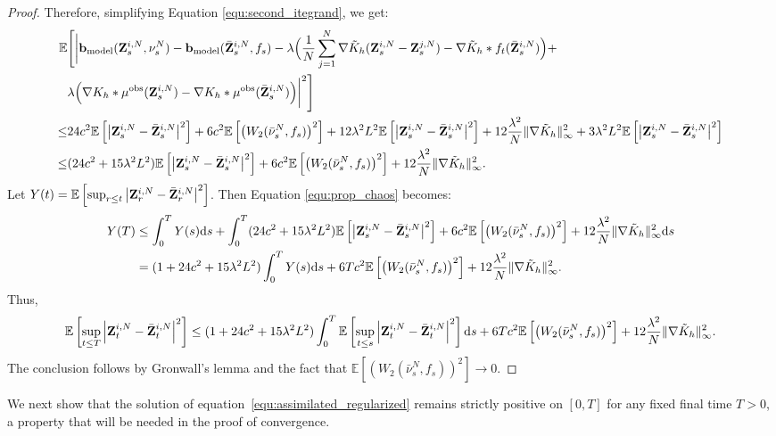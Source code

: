 \begin{proof}
Therefore, simplifying Equation \eqref{equ:second_itegrand}, we get:
\begin{equation*}
\begin{aligned}
\mathbb E &\Bigg[\bigg|\mathbf{b}_\mathrm{model}(\mathbf{Z}^{i,N}_s,\nu_s^N) - \mathbf{b}_\mathrm{model}(\bar{\mathbf{Z}}^{i,N}_s, f_s) - \lambda \Big(\frac{1}{N}\sum_{j=1}^N \nabla \tilde  K_h(\mathbf{Z}^{i,N}_s - \mathbf{Z}^{j,N}_s) - \nabla \tilde{K}_h*f_t(\bar{\mathbf{Z}}^{i,N}_s)  \Big) +\\&\lambda\Big(\nabla   K_h *\mu^{\mathrm{obs}} (\mathbf{Z}^{i,N}_s) - \nabla   K_h *\mu^{\mathrm{obs}} (\bar{\mathbf{Z}}^{i,N}_s)\Big)\bigg|^2\Bigg] \\
\leq & 24c^2 \mathbb E\left[\left|\mathbf{Z}^{i,N}_s-\bar{\mathbf{Z}}^{i,N}_s\right|^2\right] + 6c^2 \mathbb E \left[\left(W_2(\bar{\nu}^N_s,f_s)\right)^2\right] + 12\lambda^2 L^2 \mathbb E \left[\left|\mathbf{Z}^{i,N}_s - \bar{\mathbf{Z}}^{i,N}_s\right|^2\right] + 12\frac{\lambda^2}{N} \|\nabla\tilde{K}_h\|_\infty^2 +
3 \lambda^2 L^2 \mathbb E \left[ \left|\mathbf{Z}^{i,N}_s - \bar{\mathbf{Z}}^{i,N}_s\right|^2\right]\\
\leq & (24c^2+ 15\lambda^2 L^2) \mathbb E \left[ \left|\mathbf{Z}^{i,N}_s - \bar{\mathbf{Z}}^{i,N}_s\right|^2\right] + 6c^2\mathbb E \left[\left(W_2(\bar{\nu}^N_s,f_s)\right)^2\right] + 12\frac{\lambda^2}{N} \|\nabla\tilde{K}_h\|_\infty^2.
\end{aligned}
\end{equation*}
Let $Y(t) = \mathbb E\left[\sup_{r\leq t}\left|\mathbf{Z}^{i,N}_r-\bar{\mathbf{Z}}^{i,N}_r\right|^2\right]$. Then Equation \eqref{equ:prop_chaos} becomes:
\begin{equation*}
\begin{aligned}
Y(T) &\leq \int^T_0 Y(s) \mathrm{d} s + \int^T_0 (24c^2+ 15\lambda^2 L^2) \mathbb E \left[ \left|\mathbf{Z}^{i,N}_s - \bar{\mathbf{Z}}^{i,N}_s\right|^2\right] + 6c^2\mathbb E \left[\left(W_2(\bar{\nu}^N_s,f_s)\right)^2\right]+ 12\frac{\lambda^2}{N} \|\nabla\tilde{K}_h\|_\infty^2\mathrm{d} s\\
&= (1+24c^2+ 15\lambda^2 L^2) \int^T_0 Y(s) \mathrm{d} s + 6Tc^2\mathbb E \left[\left(W_2(\bar{\nu}^N_s,f_s)\right)^2\right] + 12\frac{\lambda^2}{N} \|\nabla\tilde{K}_h\|_\infty^2.
\end{aligned}
\end{equation*}
Thus,
\[
\begin{aligned}
    \mathbb E\left[\sup_{t\leq T}\left|\mathbf{Z}^{i,N}_t-\bar{\mathbf{Z}}^{i,N}_t\right|^2\right] \leq (1+24c^2+ 15\lambda^2 L^2)\int_0^T \mathbb E\left[\sup_{t\leq s}\left|\mathbf{Z}^{i,N}_t-\bar{\mathbf{Z}}^{i,N}_t\right|^2\right]
    \mathrm{d} s+ 6Tc^2\mathbb E \left[\left(W_2(\bar{\nu}^N_s,f_s)\right)^2\right] + 12\frac{\lambda^2}{N} \|\nabla\tilde{K}_h\|_\infty^2.
\end{aligned}
\]
The conclusion follows by Gronwall's lemma and the fact that $\mathbb E \left[\left(W_2(\bar{\nu}^N_s,f_s)\right)^2\right] \to 0$.
\end{proof}
We next show that the solution of equation~\eqref{equ:assimilated_regularized}
remains strictly positive on $[0,T]$ for any fixed final time $T>0$,
a property that will be needed in the proof of convergence.



